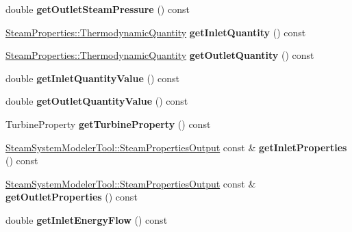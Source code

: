 \begin{DoxyCompactItemize}
\item 
\mbox{\label{class_turbine_a1589b2364a553db7aaa875bb543d171d}} 
double {\bfseries get\+Outlet\+Steam\+Pressure} () const
\item 
\mbox{\label{class_turbine_ac9e91d9539cea5cd1e0037c397c28c78}} 
\hyperlink{class_steam_properties_ae0294bedf7d178c2d8fb6aed0f62fbff}{Steam\+Properties\+::\+Thermodynamic\+Quantity} {\bfseries get\+Inlet\+Quantity} () const
\item 
\mbox{\label{class_turbine_acd3e98ab67754b652de97498d9bec6d2}} 
\hyperlink{class_steam_properties_ae0294bedf7d178c2d8fb6aed0f62fbff}{Steam\+Properties\+::\+Thermodynamic\+Quantity} {\bfseries get\+Outlet\+Quantity} () const
\item 
\mbox{\label{class_turbine_a3d8a3f317fa71abb3404144371615725}} 
double {\bfseries get\+Inlet\+Quantity\+Value} () const
\item 
\mbox{\label{class_turbine_aca98f128213e02e95dfd6f4b2ad8de4e}} 
double {\bfseries get\+Outlet\+Quantity\+Value} () const
\item 
\mbox{\label{class_turbine_a14f6eff49b501aa8c5a22d404dbeaac0}} 
Turbine\+Property {\bfseries get\+Turbine\+Property} () const
\item 
\mbox{\label{class_turbine_a7a906cf74affed9acfa4045964eccbf6}} 
\hyperlink{struct_steam_system_modeler_tool_1_1_steam_properties_output}{Steam\+System\+Modeler\+Tool\+::\+Steam\+Properties\+Output} const  \& {\bfseries get\+Inlet\+Properties} () const
\item 
\mbox{\label{class_turbine_aa9449622449e78285a258823ff77c8ec}} 
\hyperlink{struct_steam_system_modeler_tool_1_1_steam_properties_output}{Steam\+System\+Modeler\+Tool\+::\+Steam\+Properties\+Output} const  \& {\bfseries get\+Outlet\+Properties} () const
\item 
\mbox{\label{class_turbine_ae5d55a7b882e4780d490d43409f8f06c}} 
double {\bfseries get\+Inlet\+Energy\+Flow} () const
\item 
\mbox{\label{class_turbine_aa20c0f9dd81cd9bfd5eda77f588516b5}} 

\end{DoxyCompactItemize}
